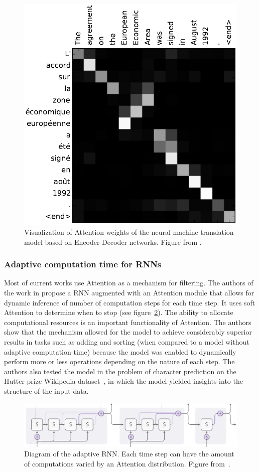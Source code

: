 \documentclass[12pt]{article}
\begin{document}
\begin{figure}
\begin{center}
    \includegraphics[width=0.31\linewidth]{./img/nt-att.png}
\caption{
    Visualization of Attention weights of the neural machine translation model
    based on Encoder-Decoder networks.
    Figure from \cite{ref:enc-dec}.
}
\label{fig:ntatt}
\end{center}
\end{figure}

\subsubsection{Adaptive computation time for RNNs}
Most of current works use Attention as a mechanism for filtering.
The authors of the work in \cite{ref:act} propose a RNN augmented with an Attention module that allows for
dynamic inference of number of computation steps for each time step.
It uses soft Attention to determine when to stop (see figure~\ref{fig:adaptive-comp}).
The ability to allocate computational resources is an important functionality of Attention.
The authors show that the mechanism allowed for the model to achieve considerably superior results
in tasks such as adding and sorting (when compared to a model without adaptive computation time)
because the model was enabled to dynamically perform more or less operations depending on the nature
of each step.
The authors also tested the model in the problem of character prediction on the Hutter prize Wikipedia
dataset~\cite{ref:hutter}, in which the model yielded insights into the structure of the input data.

\begin{figure}
\begin{center}
    \includegraphics[width=0.9\linewidth]{./img/adaptive_comp.png}
\caption{
    Diagram of the adaptive RNN.
    Each time step can have the amount of computations varied by an Attention distribution.
    Figure from~\cite{ref:distill}.
}
\label{fig:adaptive-comp}
\end{center}
\end{figure}
\end{document}
